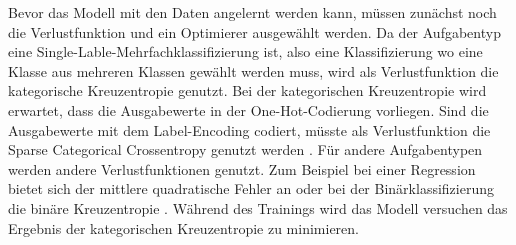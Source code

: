 Bevor das Modell mit den Daten angelernt werden kann, müssen zunächst noch die Verlustfunktion und ein Optimierer ausgewählt werden. Da der Aufgabentyp eine Single-Lable-Mehrfachklassifizierung 
ist, also eine Klassifizierung wo eine Klasse aus mehreren Klassen gewählt werden muss, wird als Verlustfunktion die kategorische Kreuzentropie genutzt.
Bei der kategorischen Kreuzentropie wird erwartet, dass die Ausgabewerte in der One-Hot-Codierung vorliegen. Sind die Ausgabewerte mit dem Label-Encoding codiert,
müsste als Verlustfunktion die \glqq Sparse Categorical Crossentropy\grqq{} genutzt werden \cite{KerasDoc}. Für andere Aufgabentypen werden andere 
Verlustfunktionen genutzt. Zum Beispiel bei einer Regression bietet sich der mittlere quadratische Fehler an oder bei der Binärklassifizierung die binäre Kreuzentropie \cite[vgl. S.155]{DL_PY}.
Während des Trainings wird das Modell versuchen das Ergebnis der kategorischen Kreuzentropie zu minimieren. 

